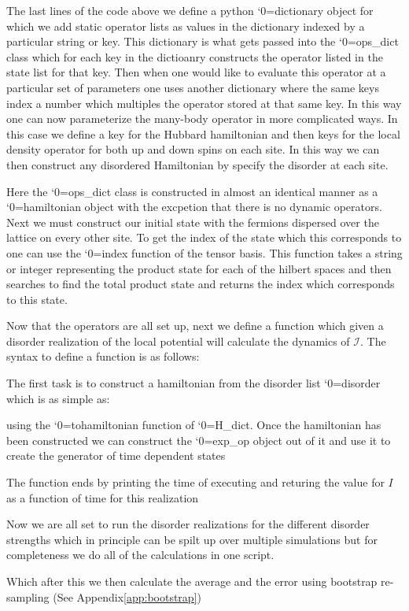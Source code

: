 \documentclass{SciPost}
\newcommand\0{\scalebox{-1}[1]{0}}
\let\svttfamily\ttfamily
\renewcommand\ttfamily{\svttfamily\catcode`0=\active }
\renewcommand\texttt{\bgroup\ttfamily\texttthelp}
\def\texttthelp#1{#1\egroup}
\newcommand{\MBLcode}{example9.py}
\begin{document}
The last lines of the code above we define a python \texttt{dictionary} object for which we add static operator lists as values in the dictionary indexed by a particular string or key. This dictionary is what gets passed into the \texttt{ops\_dict} class which for each key in the dictioanry constructs the operator listed in the state list for that key. Then when one would like to evaluate this operator at a particular set of parameters one uses another dictionary where the same keys index a number which multiples the operator stored at that same key. In this way one can now parameterize the many-body operator in more complicated ways. In this case we define a key for the Hubbard hamiltonian and then keys for the local density operator for both up and down spins on each site. In this way we can then construct any disordered Hamiltonian by specify the disorder at each site. 

Here the \texttt{ops\_dict} class is constructed in almost an identical manner as a \texttt{hamiltonian} object with the excpetion that there is no dynamic operators. Next we must construct our initial state with the fermions dispersed over the lattice on every other site. To get the index of the state which this corresponds to one can use the \texttt{index} function of the tensor basis. This function takes a string or integer representing the product state for each of the hilbert spaces and then searches to find the total product state and returns the index which corresponds to this state. 


Now that the operators are all set up, next we define a function which given a disorder realization of the local potential will calculate the dynamics of $\mathcal{I}$. The syntax to define a function is as follows:

The first task is to construct a hamiltonian from the disorder list \texttt{disorder} which is as simple as:

using the \texttt{tohamiltonian} function of \texttt{H\_dict}. Once the hamiltonian has been constructed we can construct the \texttt{exp\_op} object out of it and use it to create the generator of time dependent states

The function ends by printing the time of executing and returing the value for $I$ as a function of time for this realization


Now we are all set to run the disorder realizations for the different disorder strengths which in principle can be spilt up over multiple simulations but for completeness we do all of the calculations in one script. 

Which after this we then calculate the average and the error using bootstrap re-sampling (See Appendix\ref{app:bootstrap})

\end{document}
